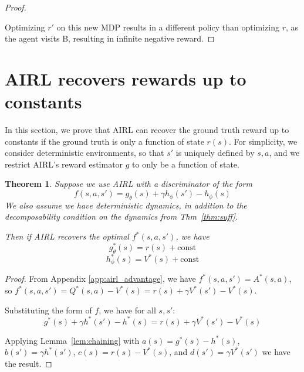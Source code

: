\documentclass{article} \usepackage{iclr2018_conference,times}
\newtheorem{theorem}{Theorem}[section]
\newcommand{\const}{\textrm{const}}
\begin{document}
\begin{proof}
\begin{figure}[h]
\centering
{}
\end{figure}

Optimizing $r'$ on this new MDP results in a different policy than optimizing $r$, as the agent visits B, resulting in infinite negative reward.
\end{proof}

\section{AIRL recovers rewards up to constants}
\label{app:airl_proof}

In this section, we prove that AIRL can recover the ground truth reward up to constants if the ground truth is only a function of state $r(s)$. For simplicity, we consider deterministic environments, so that $s'$ is uniquely defined by $s,a$, and we restrict AIRL's reward estimator $g$ to only be a function of state.

\begin{theorem}
Suppose we use AIRL with a discriminator of the form
\[f(s,a,s') = g_\theta(s) + \gamma h_\phi(s') - h_\phi(s)\]
We also assume we have deterministic dynamics, in addition to the decomposability condition on the dynamics from Thm~\ref{thm:suff}.

Then if AIRL recovers the optimal $f^*(s,a,s')$, we have
\[g_\theta^*(s) = r(s) + \const \]
\[h_\phi^*(s) = V^*(s) + \const \]
\end{theorem}
\begin{proof}

From Appendix \ref{app:airl_advantage}, we have $f^*(s,a,s') = A^*(s,a)$, so $f^*(s,a,s') = Q^*(s,a)-V^*(s) = r(s) + \gamma V^*(s') - V^*(s)$.

Substituting the form of $f$, we have for all $s, s'$:
\[g^*(s) + \gamma h^*(s') - h^*(s) = r(s) + \gamma V^*(s') - V^*(s)\]

Applying Lemma~\ref{lem:chaining} with $a(s)=g^*(s)-h^*(s)$, $b(s') = \gamma h^*(s')$, $c(s) = r(s) - V^*(s)$, and $d(s') = \gamma V^*(s')$ we have the result.
\end{proof}
\end{document}
